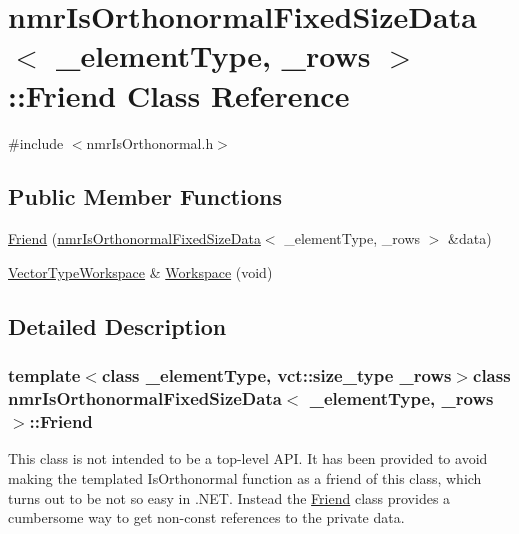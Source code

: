 \hypertarget{classnmr_is_orthonormal_fixed_size_data_1_1_friend}{\section{nmr\-Is\-Orthonormal\-Fixed\-Size\-Data$<$ \-\_\-element\-Type, \-\_\-rows $>$\-:\-:Friend Class Reference}
\label{classnmr_is_orthonormal_fixed_size_data_1_1_friend}
}


{\ttfamily \#include $<$nmr\-Is\-Orthonormal.\-h$>$}

\subsection*{Public Member Functions}
\begin{DoxyCompactItemize}
\item 
\hyperlink{classnmr_is_orthonormal_fixed_size_data_1_1_friend_a8e272eb3a07d60b6a350cfcaabff3acd}{Friend} (\hyperlink{classnmr_is_orthonormal_fixed_size_data}{nmr\-Is\-Orthonormal\-Fixed\-Size\-Data}$<$ \-\_\-element\-Type, \-\_\-rows $>$ \&data)
\item 
\hyperlink{classnmr_is_orthonormal_fixed_size_data_a9c2423d8da4e6400b83e1425454bbbe3}{Vector\-Type\-Workspace} \& \hyperlink{classnmr_is_orthonormal_fixed_size_data_1_1_friend_aec2006550f76ba340048e60db7abb431}{Workspace} (void)
\end{DoxyCompactItemize}


\subsection{Detailed Description}
\subsubsection*{template$<$class \-\_\-element\-Type, vct\-::size\-\_\-type \-\_\-rows$>$class nmr\-Is\-Orthonormal\-Fixed\-Size\-Data$<$ \-\_\-element\-Type, \-\_\-rows $>$\-::\-Friend}

This class is not intended to be a top-\/level A\-P\-I. It has been provided to avoid making the templated Is\-Orthonormal function as a friend of this class, which turns out to be not so easy in .N\-E\-T. Instead the \hyperlink{classnmr_is_orthonormal_fixed_size_data_1_1_friend}{Friend} class provides a cumbersome way to get non-\/const references to the private data. 

